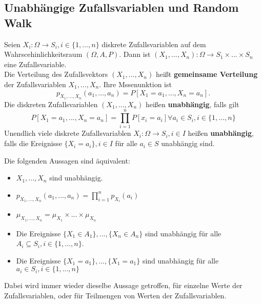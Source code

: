 \subsection{Unabh\"angige Zufallsvariablen und Random Walk}
\begin{definition}
Seien $X_i:\Omega\rightarrow S_i,i\in\{1,...,n\}$ diskrete Zufallsvariablen auf dem Wahrscehinlichkeitsraum $(\Omega,A,P)$. Dann ist $(X_1,...,X_n):\Omega\rightarrow S_1\times...\times S_n$ eine Zufallsvariable.\\
Die Verteilung des Zufallsvektors $(X_1,...,X_n)$ hei\ss t \textbf{gemeinsame Verteilung} der Zufallsvariablen $X_1,...,X_n$. Ihre Mssenunktion ist
\[p_{X_1,...,X_n}(a_1,...,a_n)=P[X_1=a_1,...,X_n=a_n].\]
Die diskreten Zufallsvariablen $(X_1,...,X_n)$ hei\ss en \textbf{unabh\"angig}, falls gilt
\[P[X_1=a_1,...,X_n=a_n]=\prod_{i=1}^nP[x_i=a_i]\forall a_i\in S_i, i\in\{1,...,n\}\]
Unendlich viele diskrete Zufallsvariablen $X_i:\Omega\rightarrow S_i, i\in I$ hei\ss en \textbf{unabh\"angig}, falls die Ereignisse $\{X_i=a_i\},i\in I$ f\"ur alle $a_i\in S$ unabh\"angig sind.
\end{definition}
\begin{satz}
Die folgenden Aussagen sind \"aquivalent:
\begin{itemize}
\item $X_1,...,X_n$ sind unabh\"angig.
\item $p_{X_1,...,X_n}(a_1,...,a_n)=\prod_{i=1}^np_{X_i}(a_i)$
\item $\mu _{X_1,...,X_n}=\mu_{X_1}\times...\times\mu_{X_n}$
\item Die Ereignisse $\{X_1\in A_1\},...,\{X_n\in A_n\}$ sind unabh\"angig f\"ur alle $A_i\subseteq S_i, i\in\{1,...,n\}$.
\item Die Ereignisse $\{X_1=a_1\},...,\{X_1=a_1\}$ sind unabh\"angig f\"ur alle $a_i\in S_i,i\in\{1,...,n\}$
\end{itemize}
Dabei wird immer wieder dieselbe Aussage getroffen, f\"ur einzelne Werte der Zufallsvariablen, oder f\"ur Teilmengen von Werten der Zufallsvariablen.
\end{satz}
